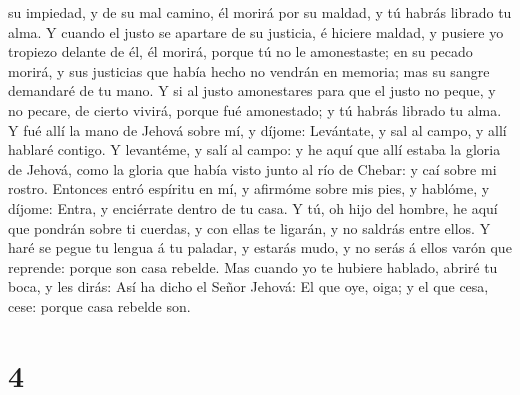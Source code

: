 su impiedad, y de su mal camino, él morirá por su maldad, y tú habrás
librado tu alma.  Y cuando el justo se apartare de su
justicia, é hiciere maldad, y pusiere yo tropiezo delante de él, él
morirá, porque tú no le amonestaste; en su pecado morirá, y sus
justicias que había hecho no vendrán en memoria; mas su sangre demandaré
de tu mano.  Y si al justo amonestares para que el justo
no peque, y no pecare, de cierto vivirá, porque fué amonestado; y tú
habrás librado tu alma.  Y fué allí la mano de Jehová
sobre mí, y díjome: Levántate, y sal al campo, y allí hablaré contigo.
 Y levantéme, y salí al campo: y he aquí que allí estaba
la gloria de Jehová, como la gloria que había visto junto al río de
Chebar: y caí sobre mi rostro.  Entonces entró espíritu
en mí, y afirmóme sobre mis pies, y hablóme, y díjome: Entra, y
enciérrate dentro de tu casa.  Y tú, oh hijo del hombre,
he aquí que pondrán sobre ti cuerdas, y con ellas te ligarán, y no
saldrás entre ellos.  Y haré se pegue tu lengua á tu
paladar, y estarás mudo, y no serás á ellos varón que reprende: porque
son casa rebelde.  Mas cuando yo te hubiere hablado,
abriré tu boca, y les dirás: Así ha dicho el Señor Jehová: El que oye,
oiga; y el que cesa, cese: porque casa rebelde son.

\hypertarget{section-3}{%
\section{4}\label{section-3}}

